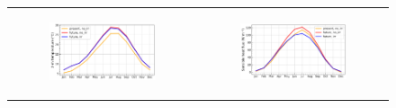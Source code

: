 \begin{figure}[htbp]
\begin{tabular}{cc}
        \begin{subfigure}[b]{0.5\textwidth}
            \caption{}
            \includegraphics[width=\textwidth]{images/chap4/future/SC_t2m_presfutirr.png}
        \end{subfigure} &
        \begin{subfigure}[b]{0.5\textwidth}
            \caption{}
            \includegraphics[width=\textwidth]{images/chap4/future/SC_fluxsens_presfutirr.png}
        \end{subfigure} \\


\end{tabular}
\end{figure}
